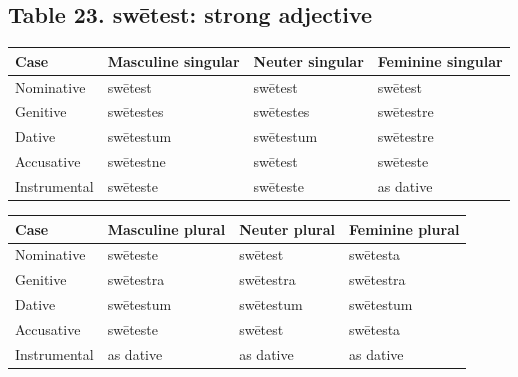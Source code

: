 \subsection*{Table 23. swētest: strong adjective}

\par\begingroup
\fontsize{10.5}{13.2}\selectfont
\setlength{\LTleft}{0pt}\setlength{\LTright}{\fill}
\noindent
\begin{tabular}{@{}>{\raggedright\arraybackslash}p{22.0mm}>{\raggedright\arraybackslash}p{31.188mm}>{\raggedright\arraybackslash}p{31.188mm}>{\raggedright\arraybackslash}p{31.188mm}@{}}
\toprule
\textbf{Case} & \textbf{Masculine singular} & \textbf{Neuter singular} & \textbf{Feminine singular} \\
\midrule
Nominative & swētest & swētest & swētest \\
Genitive & swētestes & swētestes & swētestre \\
Dative & swētestum & swētestum & swētestre \\
Accusative & swētestne & swētest & swēteste \\
Instrumental & swēteste & swēteste & as dative \\
\bottomrule
\end{tabular}
\par\endgroup
\par\addvspace{5pt}
\par\begingroup
\fontsize{10.5}{13.2}\selectfont
\setlength{\LTleft}{0pt}\setlength{\LTright}{\fill}
\noindent
\begin{tabular}{@{}>{\raggedright\arraybackslash}p{22.0mm}>{\raggedright\arraybackslash}p{31.188mm}>{\raggedright\arraybackslash}p{31.188mm}>{\raggedright\arraybackslash}p{31.188mm}@{}}
\toprule
\textbf{Case} & \textbf{Masculine plural} & \textbf{Neuter plural} & \textbf{Feminine plural} \\
\midrule
Nominative & swēteste & swētest & swētesta \\
Genitive & swētestra & swētestra & swētestra \\
Dative & swētestum & swētestum & swētestum \\
Accusative & swēteste & swētest & swētesta \\
Instrumental & as dative & as dative & as dative \\
\bottomrule
\end{tabular}
\par\endgroup

